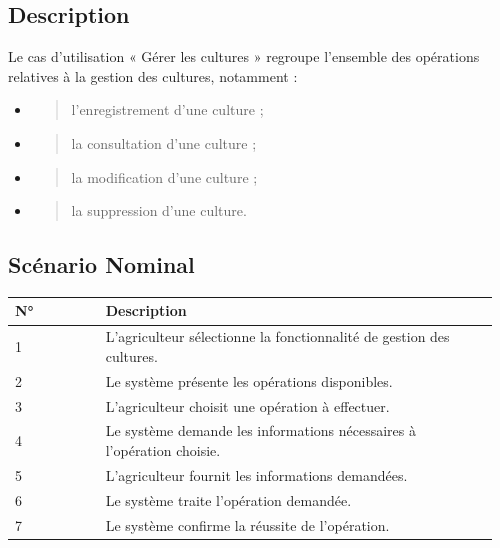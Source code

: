 \hypertarget{description}{%
\subsection{Description}\label{description}}

Le cas d'utilisation « Gérer les cultures » regroupe l'ensemble des
opérations relatives à la gestion des cultures, notamment :

\begin{itemize}
\item
  \begin{quote}
  l'enregistrement d'une culture ;
  \end{quote}
\item
  \begin{quote}
  la consultation d'une culture ;
  \end{quote}
\item
  \begin{quote}
  la modification d'une culture ;
  \end{quote}
\item
  \begin{quote}
  la suppression d'une culture.
  \end{quote}
\end{itemize}

\hypertarget{scuxe9nario-nominal-1}{%
\subsection{Scénario Nominal}\label{scuxe9nario-nominal-1}}

\begin{longtable}{@{}p{0.18\linewidth}p{0.78\linewidth}@{}}
\toprule
\rowcolors{2}{gray!10}{white}
\textbf{N°} & \textbf{Description} \\
\midrule
\endhead
1 & L'agriculteur sélectionne la fonctionnalité de gestion des
cultures. \\
2 & Le système présente les opérations disponibles. \\
3 & L'agriculteur choisit une opération à effectuer. \\
4 & Le système demande les informations nécessaires à l'opération
choisie. \\
5 & L'agriculteur fournit les informations demandées. \\
6 & Le système traite l'opération demandée. \\
7 & Le système confirme la réussite de l'opération. \\
\bottomrule
\end{longtable}

